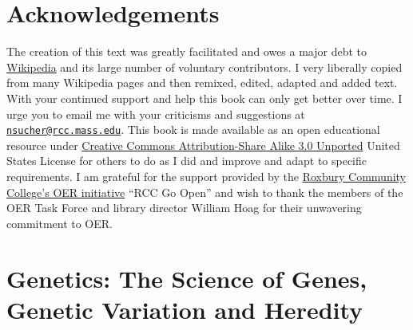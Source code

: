 




\frontmatter

\setcounter{page}{-1}


\maketitle

\setcounter{tocdepth}{1}
\tableofcontents

\clearpage

\listoffigures
\listoftables

\hypertarget{acknowledgements}{%
\chapter*{Acknowledgements}\label{acknowledgements}}

The creation of this text was greatly facilitated and owes a major debt to \href{https://www.wikipedia.org}{Wikipedia} and its large number of voluntary contributors. I very liberally copied from many Wikipedia pages and then remixed, edited, adapted and added text. With your continued support and help this book can only get better over time. I urge you to email me with your criticisms and suggestions at \href{mailto:nsucher@rcc.mass.edu}{\nolinkurl{nsucher@rcc.mass.edu}}. This book is made available as an open educational resource under \href{https://creativecommons.org/licenses/by-sa/3.0/deed.en}{Creative Commons Attribution-Share Alike 3.0 Unported} United States License for others to do as I did and improve and adapt to specific requirements. I am grateful for the support provided by the \href{http://libguides.rcc.mass.edu/OER/proposal}{Roxbury Community College's OER initiative} ``RCC Go Open'' and wish to thank the members of the OER Task Force and library director William Hoag for their unwavering commitment to OER.

\mainmatter

\hypertarget{genetics-the-science-of-genes-genetic-variation-and-heredity}{%
\chapter{Genetics: The Science of Genes, Genetic Variation and Heredity}\label{genetics-the-science-of-genes-genetic-variation-and-heredity}}

